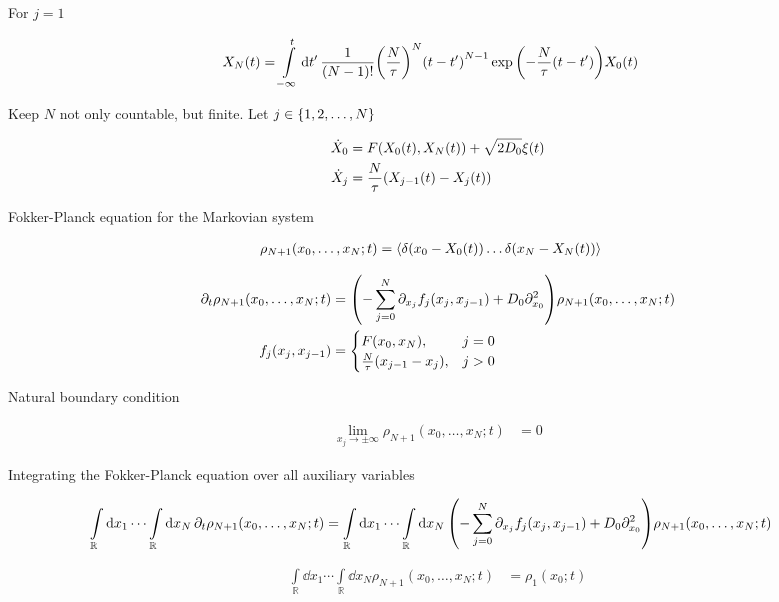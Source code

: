\documentclass[a4paper,10pt]{article}
\newcommand{\suml}{\sum\limits}
\newcommand{\intl}{\int\limits}
\begin{document}
For $j=1$

\begin{align}
	X_{N}(t)
	&=
	\intl_{-\infty}^t
	\dd{t^\prime}
	\frac{1}{(N-1)!}
	\pqty{
		\frac{N}{\tau}
	}^N
	\pqty{t-t^\prime}^{N-1}
	\exp\pqty{-\frac{N}{\tau}(t-t^\prime)}
	X_{0}(t)
\end{align}

Keep $N$ not only countable, but finite. Let $j\in\Bqty{1,2,\ldots,N}$

\begin{align}
	\dot{X}_0
	&=
	F(X_0(t),X_N(t))
	+
	\sqrt{2D_0}
	\xi(t)
	\\
	\dot{X}_j
	&=
	\frac{N}{\tau}
	\pqty{X_{j-1}(t)-X_{j}(t)}
\end{align}

Fokker-Planck equation for the Markovian system

\begin{align}
	\rho_{N+1}(x_0,\ldots,x_N;t)
	&=
	\expval{
		\delta(x_0-X_0(t))
		\ldots
		\delta(x_N-X_N(t))
	}
\end{align}

\begin{align}
	\partial_t
	\rho_{N+1}(x_0,\ldots,x_N;t)
	&=
	\pqty{
		-
		\suml_{j=0}^N
		\partial_{x_j}
		f_j(x_j,x_{j-1})
		+
		D_0
		\partial_{x_0}^2
	}
	\rho_{N+1}(x_0,\ldots,x_N;t)
\\
	f_j(x_j,x_{j-1})
	&=
	\begin{cases}
		F(x_0,x_N),&j=0
		\\
		\frac{N}{\tau}
		\pqty{x_{j-1}-x_j},&j>0
	\end{cases}
\end{align}

Natural boundary condition

\begin{align}
	\lim\limits_{x_j\to\pm\infty}
	\rho_{N+1}(x_0,\ldots,x_N;t)
	&=
	0
\end{align}

Integrating the Fokker-Planck equation over all auxiliary variables

\begin{align}
	\intl_\mathbb{R}
	\dd{x_1}
	\cdots
	\intl_\mathbb{R}
	\dd{x_N}
	\partial_t
	\rho_{N+1}(x_0,\ldots,x_N;t)
	&=
	\intl_\mathbb{R}
	\dd{x_1}
	\cdots
	\intl_\mathbb{R}
	\dd{x_N}
	\pqty{
		-
		\suml_{j=0}^N
		\partial_{x_j}
		f_j(x_j,x_{j-1})
		+
		D_0
		\partial_{x_0}^2
	}
	\rho_{N+1}(x_0,\ldots,x_N;t)
\end{align}

\begin{align}
	\intl_\mathbb{R}
	\dd{x_1}
	\cdots
	\intl_\mathbb{R}
	\dd{x_N}
	\rho_{N+1}(x_0,\ldots,x_N;t)
	&=
	\rho_{1}(x_0;t)
\end{align}
\end{document}
